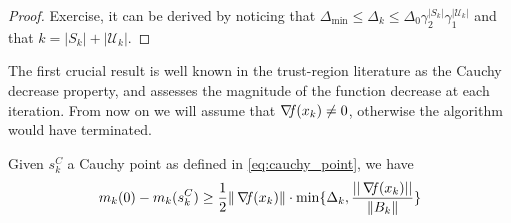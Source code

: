 \documentclass[10pt,a4paper]{article}
\begin{document}
\begin{proof}
	Exercise, it can be derived by noticing that $\Delta_{\min} \leq \Delta_k \leq \Delta_0 \gamma_2^{|S_k|} \gamma_1^{|\mathcal{U}_k|}$ and that $k= |S_k| + |\mathcal{U}_k|$.
\end{proof}
\noindent The first crucial result is well known in the trust-region literature as the Cauchy
decrease property, and assesses the magnitude of the function decrease at each iteration. From now on we will assume that $\operatorname*{\mathit{\nabla \!f}}(x_k)\neq 0$, otherwise the algorithm would have terminated.  
\begin{lemma}\label{lemma:model_decrease}
	Given $s_k^C$ a Cauchy point as defined in \eqref{eq:cauchy_point}, we have
	\begin{equation}\label{eq:model_decrease}
		m_k(0)-m_k(s_k^C) \geq \frac{1}{2}\|\operatorname*{\mathit{\nabla \!f}}(x_k)\|\cdot \min\{\Delta_k, \frac{||\operatorname*{\mathit{\nabla \!f}}(x_k)||}{\|B_k\|} \}
	\end{equation}
\end{lemma}
\end{document}

